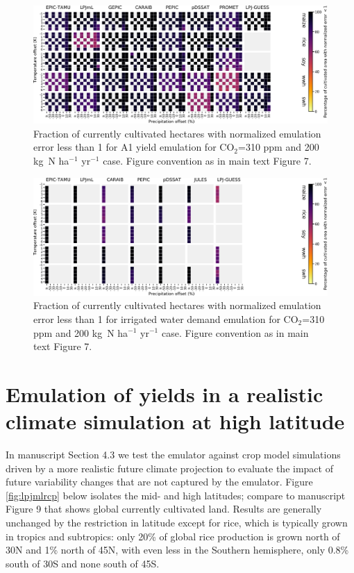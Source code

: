 \documentclass[12pt]{article}
\begin{document}
\begin{figure}[h!]
  \centering
  \includegraphics[width=15.5cm]{error_grid_360_cultivated_A1.png}
  \caption{
  Fraction of currently cultivated hectares with normalized emulation error less than 1 for A1 yield emulation for CO$_2$=310 ppm and 200 kg~N ha$^{-1}$ yr$^{-1}$ case. Figure convention as in main text Figure 7.
  }
  \label{fig:error810}
\end{figure}

\begin{figure}[h!]
  \centering
  \includegraphics[width=15.5cm]{error_grid_360_cultivated_IWD.png}
  \caption{
  Fraction of currently cultivated hectares with normalized emulation error less than 1 for irrigated water demand emulation for CO$_2$=310 ppm and 200 kg~N ha$^{-1}$ yr$^{-1}$ case. Figure convention as in main text Figure 7.
  }
  \label{fig:error810}
\end{figure}

\clearpage
\section{Emulation of yields in a realistic climate simulation at high latitude}
\begin{justify}
In manuscript Section 4.3 we test the emulator against crop model simulations driven by a more realistic future climate projection to evaluate the impact of future variability changes that are not captured by the emulator. 
	Figure \ref{fig:lpjmlrcp} below isolates the mid- and high latitudes; compare to manuscript Figure 9 that shows global currently cultivated land. 
	Results are generally unchanged by the restriction in latitude except for rice, which is typically grown in tropics and subtropics: only 20\% of global rice production is grown north of 30N and 1\% north of 45N, with even less in the Southern hemisphere, only 0.8\%  south of 30S and none south of 45S.
\end{justify}
\end{document}
